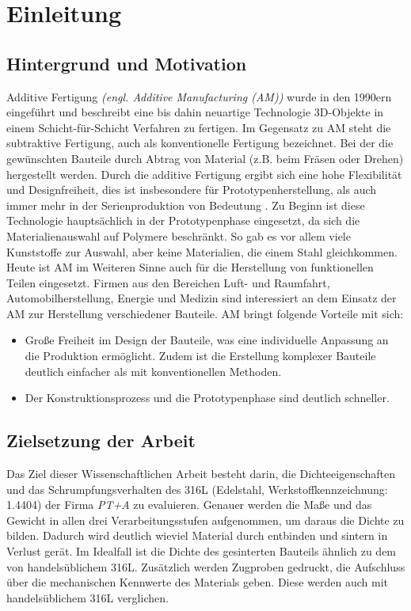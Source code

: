 \chapter{Einleitung}
\label{einleitung}

\section{Hintergrund und Motivation}
Additive Fertigung \textit{(engl. Additive Manufacturing (AM))} wurde in den 1990ern eingeführt und beschreibt eine bis dahin neuartige Technologie 3D-Objekte in einem Schicht-für-Schicht Verfahren zu fertigen. Im Gegensatz zu AM steht die subtraktive Fertigung, auch als konventionelle Fertigung bezeichnet. Bei der die gewünschten Bauteile durch Abtrag von Material (z.B. beim Fräsen oder Drehen) hergestellt werden. Durch die additive Fertigung ergibt sich eine hohe Flexibilität und Designfreiheit, dies ist insbesondere für Prototypenherstellung, als auch immer mehr in der Serienproduktion von Bedeutung \autocite{Prof.Dr.Ing.ChristianSeidel.2023}.
Zu Beginn ist diese Technologie hauptsächlich in der Prototypenphase eingesetzt, da sich die Materialienauswahl auf Polymere beschränkt. So gab es vor allem viele Kunststoffe zur Auswahl, aber keine Materialien, die einem Stahl gleichkommen.
Heute ist AM im Weiteren Sinne auch für die Herstellung von funktionellen Teilen eingesetzt.  Firmen aus den Bereichen Luft- und Raumfahrt, Automobilherstellung, Energie und Medizin sind interessiert an dem Einsatz der AM zur Herstellung verschiedener Bauteile.
AM bringt folgende Vorteile mit sich:
\Autocite{Osama2019}
\begin{itemize}
    \item Große Freiheit im Design der Bauteile, was eine individuelle Anpassung an die Produktion ermöglicht. Zudem ist die Erstellung komplexer Bauteile deutlich einfacher als mit konventionellen Methoden.
    \item Der Konstruktionsprozess und die Prototypenphase sind deutlich schneller.
\end{itemize}

\section{Zielsetzung der Arbeit}

Das Ziel dieser Wissenschaftlichen Arbeit besteht darin, die Dichteeigenschaften und das Schrumpfungsverhalten des 316L (Edelstahl, Werkstoffkennzeichnung: 1.4404) der Firma \textit{PT+A} zu evaluieren. 
Genauer werden die Maße und das Gewicht in allen drei Verarbeitungsstufen aufgenommen, um daraus die Dichte zu bilden. Dadurch wird deutlich wieviel Material durch entbinden und sintern in Verlust gerät.
Im Idealfall ist die Dichte des gesinterten Bauteils ähnlich zu dem von handelsüblichem 316L.
Zusätzlich werden Zugproben gedruckt, die Aufschluss über die mechanischen Kennwerte des Materials geben. Diese werden auch mit handelsüblichem 316L verglichen.
    
